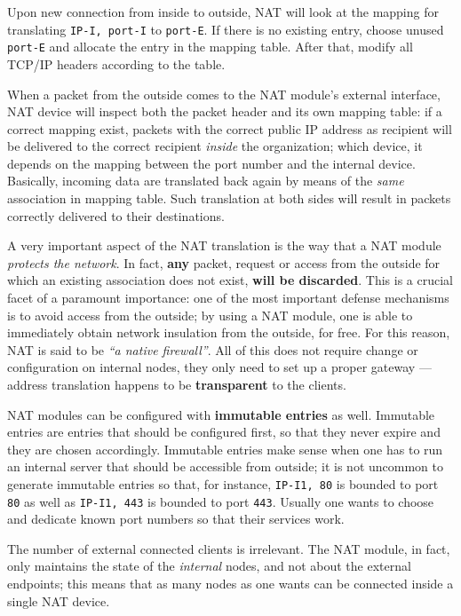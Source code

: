 \documentclass[10pt]{extreport}
\begin{document}
Upon new connection from inside to outside, NAT will look at the mapping for
translating \texttt{IP-I, port-I} to \texttt{port-E}. If there is no existing
entry, choose unused \texttt{port-E} and allocate the entry in the mapping
table. After that, modify all TCP/IP headers according to the table.

When a packet from the outside comes to the NAT module's external interface,
NAT device will inspect both the packet header and its own mapping table: if a
correct mapping exist, packets with the correct public IP address as recipient
will be delivered to the correct recipient \emph{inside} the organization;
which device, it depends on the mapping between the port number and the
internal device. Basically, incoming data are translated back again by means of
the \emph{same} association in mapping table. Such translation at both sides
will result in packets correctly delivered to their destinations.

A very important aspect of the NAT translation is the way that a NAT module
\emph{protects the network}. In fact, \textbf{any} packet, request or access
from the outside for which an existing association does not exist, \textbf{will
be discarded}. This is a crucial facet of a paramount importance: one of the
most important defense mechanisms is to avoid access from the outside; by using
a NAT module, one is able to immediately obtain network insulation from the
outside, for free. For this reason, NAT is said to be \emph{``a native
firewall''}. All of this does not require change or configuration on internal
nodes, they only need to set up a proper gateway --- address translation happens
to be \textbf{transparent} to the clients.

NAT modules can be configured with \textbf{immutable entries} as well.
Immutable entries are entries that should be configured first, so that they
never expire and they are chosen accordingly. Immutable entries make sense when
one has to run an internal server that should be accessible from outside; it is
not uncommon to generate immutable entries so that, for instance,
\texttt{IP-I1, 80} is bounded to port \texttt{80} as well as \texttt{IP-I1,
443} is bounded to port \texttt{443}. Usually one wants to choose and dedicate
known port numbers so that their services work.

The number of external connected clients is irrelevant. The NAT module, in
fact, only maintains the state of the \emph{internal} nodes, and not about the
external endpoints; this means that as many nodes as one wants can be connected
inside a single NAT device.
\end{document}

